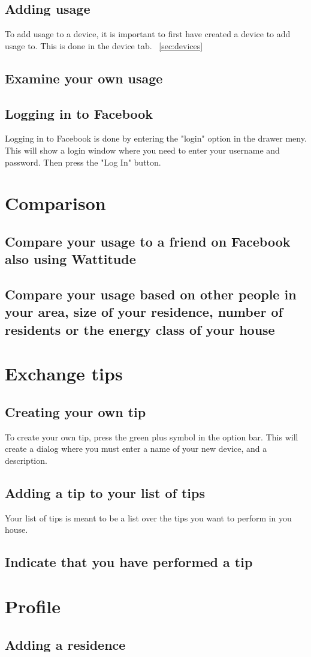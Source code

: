 \subsection{Adding usage}
To add usage to a device, it is important to first have created a device to add usage to. This is done in the device tab. ~\ref{sec:devices}
\subsection{Examine your own usage}


\subsection{Logging in to Facebook}
Logging in to Facebook is done by entering the "login" option in the drawer meny. This will show a login window where you need to enter your username and password. Then press the "Log In" button. 

\section{Comparison}
\subsection{Compare your usage to a friend on Facebook also using Wattitude}
\subsection{Compare your usage based on other people in your area, size of your residence, number of residents or the energy class of your house}

\section{Exchange tips}

\subsection{Creating your own tip}
To create your own tip, press the green plus symbol in the option bar. This will create a dialog where you must enter a name of your new device, and a description. 
\subsection{Adding a tip to your list of tips}
Your list of tips is meant to be a list over the tips you want to perform in you house. 
\subsection{Indicate that you have performed a tip}


\section{Profile}
\subsection{Adding a residence}
